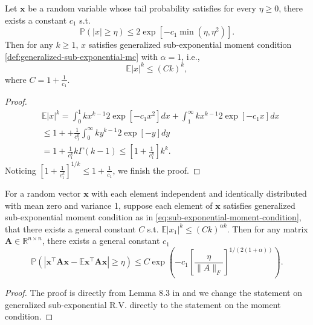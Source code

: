 \begin{lem}
\label{lemma:hanson-wright-sub-exponential}
Let $\mathbf{x}$ be a random
variable whose tail probability satisfies for every $\eta \ge 0$, there exists a constant $c_1$ s.t. 
\begin{equation}
\mathbb{P}\left(|x|\ge \eta\right)\le 2\exp\left[-c_1\min\left(\eta,  \eta^2\right)\right]. \nonumber
\end{equation}
Then for any $k\ge 1$, $x$ satisfies generalized sub-exponential moment condition \ref{def:generalized-sub-exponential-mc} with $\alpha = 1$, i.e., 
\begin{equation}
\mathbb{E} |x|^k \le (Ck)^k, \nonumber
\end{equation}\label{eq:sub-exponential-moment-condition}
where $C= 1+\frac{1}{c_1}$.
\end{lem}
\begin{proof} 
\begin{equation}
\begin{aligned}
&\mathbb{E} |x|^k =  \int_{0}^1 kx^{k-1} 2\exp[-c_1x^2]dx + \int_{1}^\infty kx^{k-1} 2\exp[-c_1x]dx \\ 
&\le 1+ + \frac{1}{c_1^k}\int_{0}^\infty ky^{k-1} 2\exp[-y]dy\\
&= 1+ \frac{1}{c_1^k} k\Gamma(k-1)\le \left[1+\frac{1}{c_1^k}\right] k^k.
\end{aligned}
\end{equation}
Noticing $\left[1+\frac{1}{c_1^k}\right]^{1/k} \le 1+\frac{1}{c_1}$, we finish the proof. 
\end{proof}


\begin{lem}\label{lemma:hanson-wright-sub-exponential-moment}
	For a random vector $\mathbf{x}$ with each element independent and identically distributed with mean zero and variance 1, suppose each element of $\mathbf{x}$
	satisfies generalized sub-exponential moment condition as in \eqref{eq:sub-exponential-moment-condition}, that there exists a general constant $C$ s.t.  $\mathbb{E} |x_1|^k \le (Ck)^{\alpha k}$. Then for any matrix $\mathbf{A} \in \mathbb{R}^{n \times n}$, there exists a general constant $c_1$
	\begin{equation}
		\mathbb{P}\left(\left|\mathbf{x}^\top \mathbf{A} \mathbf{x} - \mathbb{E} \mathbf{x}^\top \mathbf{A} \mathbf{x} \right| \ge \eta \right)\le  C \exp\left(-c_1\left[\frac{\eta}{\|A\|_F}\right]^{1/(2(1+\alpha))}\right) . \nonumber
	\end{equation}
\end{lem}
\begin{proof}
	The proof is directly from Lemma 8.3 in \cite{buhler2002finding} and we change the statement on generalized sub-exponential R.V. directly to the statement on the moment condition. 
\end{proof}






